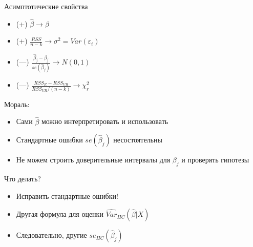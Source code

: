 \documentclass[ignorenonframetext,]{beamer}
\newcommand{\e}{\varepsilon}
\begin{document}
\begin{frame}{Асимптотические свойства}

\begin{itemize}
\item
  (+) $\hat{\beta} \to \beta$
\item
  (+) $\frac{RSS}{n-k} \to \sigma^2=Var(\e_i)$
\item
  (---) $\frac{\hat{\beta}_j-\beta_j}{se(\hat{\beta}_j)} \to N(0,1)$
\item
  (---) $\frac{RSS_R-RSS_{UR}}{RSS_{UR}/(n-k)} \to \chi^2_r$
\end{itemize}

\end{frame}

\begin{frame}{Мораль:}

\begin{itemize}
\item
  Сами $\hat{\beta}$ можно интерпретировать и использовать
\item
  Стандартные ошибки $se(\hat{\beta}_j)$ несостоятельны
\item
  Не можем строить доверительные интервалы для $\beta_j$ и проверять
  гипотезы
\end{itemize}

\end{frame}

\begin{frame}{Что делать?}

\begin{itemize}
\item
  Исправить стандартные ошибки!
\item
  Другая формула для оценки $\widehat{Var}_{HC}(\hat{\beta}|X)$
\item
  Следовательно, другие $se_{HC}(\hat{\beta}_j)$
\end{itemize}

\end{frame}
\end{document}
